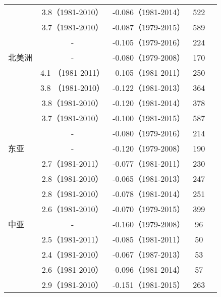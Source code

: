 \begin{table}[!t]
    \ContinuedFloat%
    \centering
    \small%
    \setlength{\tabcolsep}{7pt}%
    \renewcommand{\arraystretch}{1.2}%
    \begin{tabular}{lcccc}
    \hline
          & 3.8（1981-2010）& -0.086（1981-2014）& 522 & \citet{berrisford2015global} \\
          & 3.7（1981-2010）& -0.087（1979-2015）& 589 & \citet{dunn2016surface} \\
          & - & -0.105（1979-2016）& 224 & \citet{tian2019observed} \\
    北美洲 \quad \quad & - & -0.080（1979-2008） & 170 & \citet{vautard2010northern} \\
     & 4.1 （1981-2011）& -0.105（1981-2011）& 250 & \citet{mcvicar2012land} \\
     & 3.8 （1981-2010）& -0.122（1981-2013）& 364 & \citet{tobin2014global}\\
     & 3.8（1981-2010）& -0.120（1981-2014）& 378 & \citet{berrisford2015global} \\
     & 3.7（1981-2010）& -0.100（1981-2015）& 587 & \citet{dunn2016surface} \\
     & - & -0.080（1979-2016）& 214 & \citet{tian2019observed} \\
     东亚 & - & -0.120（1979-2008）& 190 & \citet{vautard2010northern} \\
      & 2.7（1981-2011）& -0.077（1981-2011）& 230 & \citet{mcvicar2012land} \\
      & 2.8（1981-2010）& -0.065（1981-2013）& 247 &  \citet{tobin2014global}\\
      & 2.8（1981-2010）& -0.078（1981-2014）& 251 &  \citet{berrisford2015global} \\
      & 2.6（1981-2010）& -0.070（1979-2015）& 399 & \citet{dunn2016surface} \\
     中亚 & - & -0.160（1979-2008）& 96 & \citet{vautard2010northern} \\
      & 2.5（1981-2011）& -0.085（1981-2011）& 50 & \citet{mcvicar2012land} \\
      & 2.4（1981-2010）& -0.067（1987-2013）& 53 & \citet{tobin2014global}\\
      & 2.6（1981-2010）& -0.096（1981-2014）& 57 &  \citet{berrisford2015global} \\
      & 2.9（1981-2010）& -0.151（1981-2015）& 263 & \citet{dunn2016surface} \\
     \hline
    \end{tabular}
\end{table}

